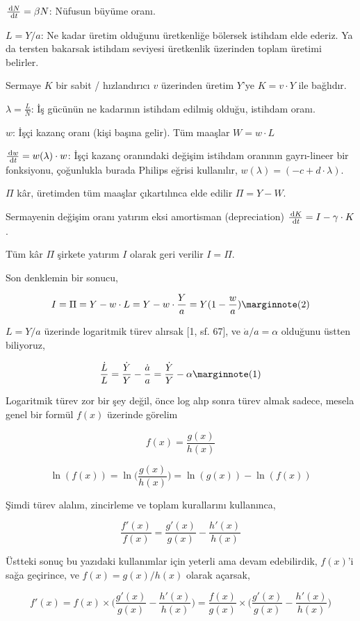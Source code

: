 \documentclass[12pt,fleqn]{article}\usepackage{../../common}
\begin{document}
$\frac{\,\mathrm{d} N}{\,\mathrm{d} t} = \beta N$: Nüfusun büyüme oranı.

$L = Y/a$: Ne kadar üretim olduğunu üretkenliğe bölersek istihdam elde
ederiz. Ya da tersten bakarsak istihdam seviyesi üretkenlik üzerinden
toplam üretimi belirler.

Sermaye $K$ bir sabit / hızlandırıcı $v$ üzerinden üretim $Y$'ye
$K = v \cdot Y$ ile bağlıdır.

$\lambda = \frac{L}{N}$: İş gücünün ne kadarının istihdam edilmiş olduğu,
istihdam oranı.

$w$: İşçi kazanç oranı (kişi başına gelir). Tüm maaşlar $W = w \cdot L$

$\frac{\,\mathrm{d} w}{\,\mathrm{d} t} = w(\lambda) \cdot w$: İşçi kazanç oranındaki değişim
istihdam oranının gayrı-lineer bir fonksiyonu, çoğunlukla burada Philips
eğrisi kullanılır, $w(\lambda) = (-c + d \cdot \lambda)$.

$\Pi$ kâr, üretimden tüm maaşlar çıkartılınca elde edilir $\Pi = Y - W$.

Sermayenin değişim oranı yatırım eksi amortisman (depreciation)
$\frac{\,\mathrm{d} K}{\,\mathrm{d} t} = I-\gamma \cdot K$.

Tüm kâr $\Pi$ şirkete yatırım $I$ olarak geri verilir $I = \Pi$.

Son denklemin bir sonucu,

$$ 
I = \Pi = Y - w \cdot L = Y - w \cdot \frac{Y}{a} = Y(1 - \frac{w}{a})
\mlabel{2}
$$

$L = Y/a$ üzerinde logaritmik türev alırsak [1, sf. 67], ve
$\dot{a}/a = \alpha$ olduğunu üstten biliyoruz,

$$ 
\frac{\dot{L}}{L} 
= \frac{\dot{Y}}{Y} - \frac{\dot{a}}{a} 
= \frac{\dot{Y}}{Y} - \alpha
\mlabel{1}
$$

Logaritmik türev zor bir şey değil, önce log alıp sonra türev almak sadece,
mesela genel bir formül $f(x)$ üzerinde görelim

$$ f(x) = \frac{g(x)}{h(x)}$$

$$ 
\ln (f(x)) = \ln \bigg( \frac{g(x)}{h(x)} \bigg) = 
\ln(g(x)) - \ln(f(x))
$$

Şimdi türev alalım, zincirleme ve toplam kurallarını kullanınca,

$$ \frac{f'(x)}{f(x)} = \frac{g'(x)}{g(x)} - \frac{h'(x)}{h(x)}$$

Üstteki sonuç bu yazıdaki kullanımlar için yeterli ama devam edebilirdik,
$f(x)$'i sağa geçirince, ve $f(x) = g(x) / h(x)$ olarak açarsak,

$$ f'(x) = f(x) \times \bigg( \frac{g'(x)}{g(x)} - \frac{h'(x)}{h(x)} \bigg)
= \frac{f(x)}{g(x)} \times \bigg( \frac{g'(x)}{g(x)} - \frac{h'(x)}{h(x)} \bigg)
$$
\end{document}
